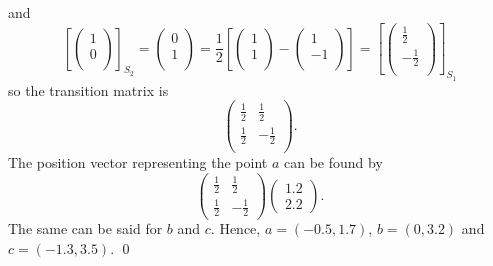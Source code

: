 \documentclass{article}
\begin{document}
and \[{{\left[ \left( \begin{matrix}
  1 \\ 
  0 \\ 
\end{matrix} \right) \right]}_{{{S}_{2}}}}=\left( \begin{matrix}
  0 \\ 
  1 \\ 
\end{matrix} \right)=\frac{1}{2}\left[ \left( \begin{matrix}
  1 \\ 
  1 \\ 
\end{matrix} \right)-\left( \begin{matrix}
  1 \\ 
  -1 \\ 
\end{matrix} \right) \right]={{\left[ \left( \begin{matrix}
  \frac{1}{2} \\ 
  -\frac{1}{2} \\ 
\end{matrix} \right) \right]}_{{{S}_{1}}}}\]
so the transition matrix is \[\left( \begin{matrix}
   \frac{1}{2} & \frac{1}{2}  \\
   \frac{1}{2} & -\frac{1}{2}  \\
\end{matrix} \right).\]
 The position vector representing the point $a$ can be found by \[\begin{pmatrix}
   \frac{1}{2} & \frac{1}{2}  \\
   \frac{1}{2} & -\frac{1}{2} 
\end{pmatrix}\begin{pmatrix}1.2\\2.2\end{pmatrix}.\] The same can be said for $b$ and $c$.
\newline
\newline Hence, $a=(-0.5,1.7)$, $b=(0,3.2)$ and $c=(-1.3,3.5)$. \qed 
\end{document}
